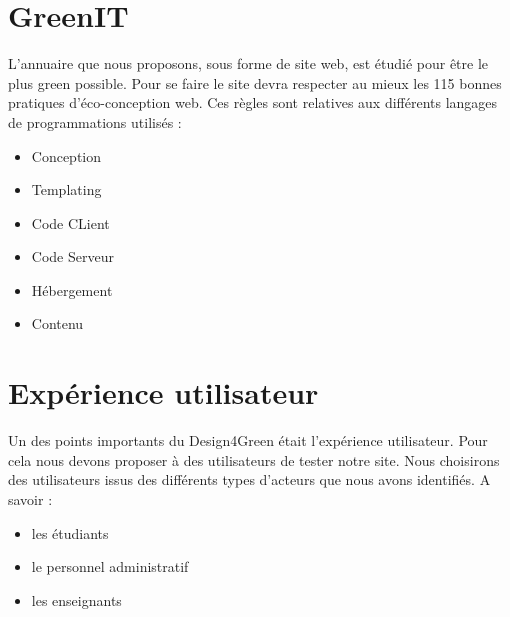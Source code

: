 \documentclass[11pt,a4paper]{report}
\begin{document}
		\section{GreenIT}
			L'annuaire que nous proposons, sous forme de site web, est étudié pour être le plus green possible. Pour se faire le site devra respecter au mieux les 115 bonnes pratiques d'éco-conception web. Ces règles sont relatives aux différents langages de programmations utilisés :
	\begin{itemize}
			\item Conception
			\item  Templating
			\item Code CLient
			\item Code Serveur
			\item Hébergement
			\item Contenu
	\end{itemize}		
		\section{Expérience utilisateur}
		Un des points importants du Design4Green était l'expérience utilisateur. Pour cela nous devons proposer à des utilisateurs de tester notre site. Nous choisirons des utilisateurs issus des différents types d'acteurs que nous avons identifiés. A savoir :
		\begin{itemize}
			\item les étudiants
			\item  le personnel administratif
			\item les enseignants
		\end{itemize}
\end{document}
